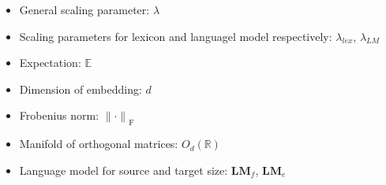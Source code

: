 \begin{itemize}
	\item General scaling parameter: $\lambda$
	\item Scaling parameters for lexicon and languagel model respectively: $\lambda_{lex}$, $\lambda_{LM}$
	\item Expectation: $\mathbb{E}$
	\item Dimension of embedding: $d$
	\item Frobenius norm: ${\lVert \cdot \rVert}_{\text{F}}$
	\item  Manifold of orthogonal matrices: $ O_d(\mathbb{R})$
	\item Language model for source and target size: $\textbf{LM}_f$, $\textbf{LM}_e$
\end{itemize}











